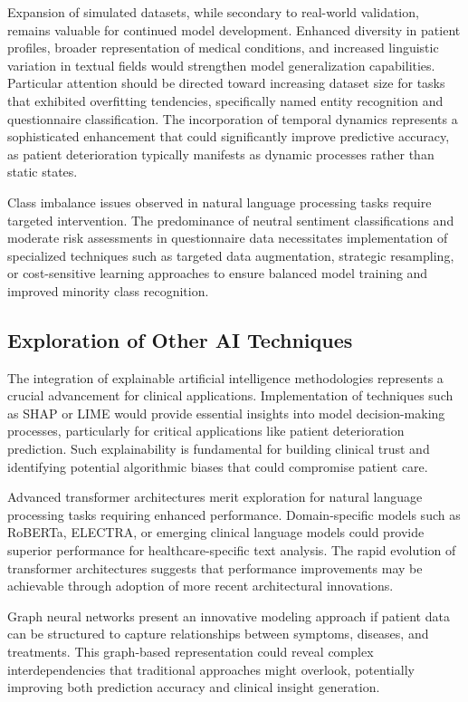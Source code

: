 Expansion of simulated datasets, while secondary to real-world validation, remains valuable for continued model development. Enhanced diversity in patient profiles, broader representation of medical conditions, and increased linguistic variation in textual fields would strengthen model generalization capabilities. Particular attention should be directed toward increasing dataset size for tasks that exhibited overfitting tendencies, specifically named entity recognition and questionnaire classification. The incorporation of temporal dynamics represents a sophisticated enhancement that could significantly improve predictive accuracy, as patient deterioration typically manifests as dynamic processes rather than static states.

Class imbalance issues observed in natural language processing tasks require targeted intervention. The predominance of neutral sentiment classifications and moderate risk assessments in questionnaire data necessitates implementation of specialized techniques such as targeted data augmentation, strategic resampling, or cost-sensitive learning approaches to ensure balanced model training and improved minority class recognition.

\subsection{Exploration of Other AI Techniques}

The integration of explainable artificial intelligence methodologies represents a crucial advancement for clinical applications. Implementation of techniques such as SHAP or LIME would provide essential insights into model decision-making processes, particularly for critical applications like patient deterioration prediction. Such explainability is fundamental for building clinical trust and identifying potential algorithmic biases that could compromise patient care.

Advanced transformer architectures merit exploration for natural language processing tasks requiring enhanced performance. Domain-specific models such as RoBERTa, ELECTRA, or emerging clinical language models could provide superior performance for healthcare-specific text analysis. The rapid evolution of transformer architectures suggests that performance improvements may be achievable through adoption of more recent architectural innovations.

Graph neural networks present an innovative modeling approach if patient data can be structured to capture relationships between symptoms, diseases, and treatments. This graph-based representation could reveal complex interdependencies that traditional approaches might overlook, potentially improving both prediction accuracy and clinical insight generation.

